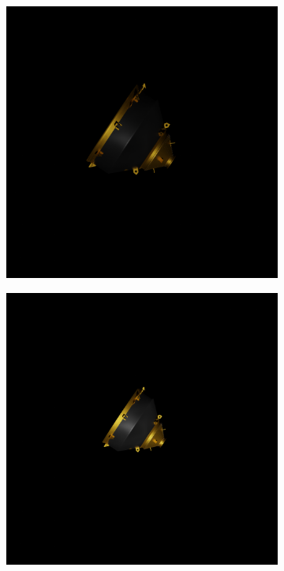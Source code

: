 \begin{figure}[!h]
\begin{subfigure}{0.24\linewidth}
        \includegraphics[width=\linewidth]{Images/VIS20m.png}
    \end{subfigure}\hfill
    \begin{subfigure}{0.24\linewidth}
        \centering
        \includegraphics[width=\linewidth]{Images/VIS50m.png}

\end{subfigure}
\end{figure}
